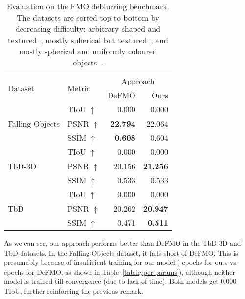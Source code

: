    \begin{table}
        \caption{
            Evaluation on the FMO deblurring benchmark.
            The datasets are sorted top-to-bottom by decreasing difficulty: arbitrary shaped and textured~\citep{falling-objs}, mostly spherical but textured~\citep{tbd-3d}, and mostly spherical and uniformly coloured objects~\citep{tbd}.
        }%
        \label{tab:benchmark}
        \centering
        \begin{tabular}{llrr}
            \toprule
            \multirow{2}[2]{*}{Dataset} & \multirow{2}[2]{*}{Metric} & \multicolumn{2}{c}{Approach}\\
            \cmidrule(lr){3-4}
            && DeFMO & Ours\\
            \midrule
            \multirow{3}{*}{Falling Objects} & TIoU $\uparrow$ & 0.000 & 0.000\\
            & PSNR $\uparrow$ & \textbf{22.794} & 22.064\\
            & SSIM $\uparrow$ & \textbf{0.608} & 0.604\\
            \midrule
            \multirow{3}{*}{TbD-3D} & TIoU $\uparrow$ & 0.000 & 0.000\\
            & PSNR $\uparrow$ & 20.156 & \textbf{21.256}\\
            & SSIM $\uparrow$ & 0.533 & 0.533\\
            \midrule
            \multirow{3}{*}{TbD} & TIoU $\uparrow$ & 0.000 & 0.000 \\
            & PSNR $\uparrow$ & 20.262 & \textbf{20.947} \\
            & SSIM $\uparrow$ & 0.471 & \textbf{0.511}\\
            \bottomrule
        \end{tabular}
    \end{table}


    As we can see, our approach performs better than DeFMO in the TbD-3D and TbD datasets.
    In the Falling Objects dataset, it falls short of DeFMO.\@
    This is presumably because of insufficient training for our model (\oursepochs{} epochs for ours vs  epochs for DeFMO, as shown in Table~\ref{tab:hyper-params}), although neither model is trained till convergence (due to lack of time).
    Both models get 0.000 TIoU, further reinforcing the previous remark.

